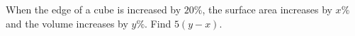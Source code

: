 When the edge of a cube is increased by $20\%$, the surface area increases by $x\%$ and the volume increases by $y\%$. Find $5(y-x)$.
